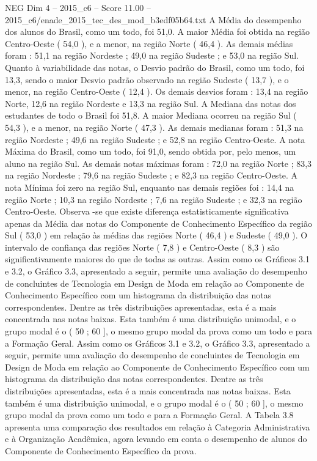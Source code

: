\begin{textsample}{NEG Dim 4 – 2015\_c6 – Score 11.00 – 2015\_c6/enade\_2015\_tec\_des\_mod\_b3edf05b64.txt}
A Média do desempenho dos alunos do Brasil, como um todo, foi 51,0.
A maior Média foi obtida na região Centro-Oeste ( 54,0 ), e a menor, na região Norte ( 46,4 ).
As demais médias foram : 51,1 na região Nordeste ; 49,0 na região Sudeste ; e 53,0 na região Sul.
Quanto à variabilidade das notas, o Desvio padrão do Brasil, como um todo, foi 13,3, sendo o maior Desvio padrão observado na região Sudeste ( 13,7 ), e o menor, na região Centro-Oeste ( 12,4 ).
Os demais desvios foram : 13,4 na região Norte, 12,6 na região Nordeste e 13,3 na região Sul.
A Mediana das notas dos estudantes de todo o Brasil foi 51,8.
A maior Mediana ocorreu na região Sul ( 54,3 ), e a menor, na região Norte ( 47,3 ).
As demais medianas foram : 51,3 na região Nordeste ; 49,6 na região Sudeste ; e 52,8 na região Centro-Oeste.
A nota Máxima do Brasil, como um todo, foi 91,0, sendo obtida por, pelo menos, um aluno na região Sul.
As demais notas máximas foram : 72,0 na região Norte ; 83,3 na região Nordeste ; 79,6 na região Sudeste ; e 82,3 na região Centro-Oeste.
A nota Mínima foi zero na região Sul, enquanto nas demais regiões foi : 14,4 na região Norte ; 10,3 na região Nordeste ; 7,6 na região Sudeste ; e 32,3 na região Centro-Oeste.
Observa -se que existe diferença estatisticamente significativa apenas da Média das notas do Componente de Conhecimento Específico da região Sul ( 53,0 ) em relação às médias das regiões Norte ( 46,4 ) e Sudeste ( 49,0 ).
O intervalo de confiança das regiões Norte ( 7,8 ) e Centro-Oeste ( 8,3 ) são significativamente maiores do que de todas as outras.
Assim como os Gráficos 3.1 e 3.2, o Gráfico 3.3, apresentado a seguir, permite uma avaliação do desempenho de concluintes de Tecnologia em Design de Moda em relação ao Componente de Conhecimento Específico com um histograma da distribuição das notas correspondentes.
Dentre as três distribuições apresentadas, esta é a mais concentrada nas notas baixas.
Esta também é uma distribuição unimodal, e o grupo modal é o ( 50 ; 60 ], o mesmo grupo modal da prova como um todo e para a Formação Geral.
Assim como os Gráficos 3.1 e 3.2, o Gráfico 3.3, apresentado a seguir, permite uma avaliação do desempenho de concluintes de Tecnologia em Design de Moda em relação ao Componente de Conhecimento Específico com um histograma da distribuição das notas correspondentes.
Dentre as três distribuições apresentadas, esta é a mais concentrada nas notas baixas.
Esta também é uma distribuição unimodal, e o grupo modal é o ( 50 ; 60 ], o mesmo grupo modal da prova como um todo e para a Formação Geral.
A Tabela 3.8 apresenta uma comparação dos resultados em relação à Categoria Administrativa e à Organização Acadêmica, agora levando em conta o desempenho de alunos do Componente de Conhecimento Específico da prova.

\end{textsample}
